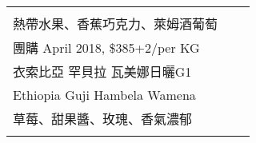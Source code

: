 \documentclass[10pt,a4paper]{article}
\begin{document}
\begin{tabular}{C{0.3090\textwidth} C{0.3075\textwidth} C{0.3065\textwidth}}
{ \vspace*{-0.22em} \\ %
\footnotesize 熱帶水果、香蕉巧克力、萊姆酒葡萄%
\vspace*{0.345em}\\%
團購   April  2018,  \$385+2/per KG \vspace*{-0.2em} \\ %
衣索比亞  罕貝拉 瓦美娜日曬G1 \vspace*{-0.12em} \\ Ethiopia  Guji Hambela Wamena%
 \vspace*{-0.22em} \\ %
\footnotesize 草莓、甜果醬、玫瑰、香氣濃郁%
%
}& 
\end{tabular}
\end{document}
